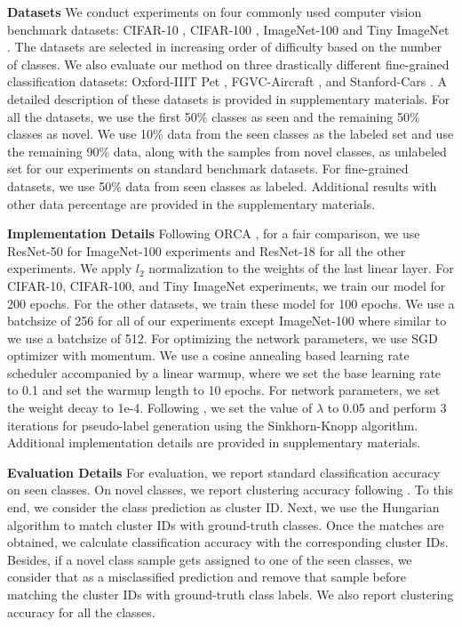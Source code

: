 \documentclass[runningheads]{eccv2022submission}
\begin{document}
\vspace{1mm}
\label{para:dataset}
\noindent \textbf{Datasets} We conduct experiments on four commonly used computer vision benchmark datasets: CIFAR-10 \cite{cifar10}, CIFAR-100 \cite{cifar100}, ImageNet-100 \cite{russakovsky2015imagenet} and Tiny ImageNet \cite{le2015tiny}. The datasets are selected in increasing order of difficulty based on the number of classes. We also evaluate our method on three drastically different fine-grained classification datasets: Oxford-IIIT Pet \cite{parkhi12a}, FGVC-Aircraft \cite{maji13fine-grained}, and Stanford-Cars \cite{KrauseStarkDengFei-Fei_3DRR2013}. A detailed description of these datasets is provided in supplementary materials. For all the datasets, we use the first 50\% classes as seen and the remaining 50\% classes as novel. We use 10\% data from the seen classes as the labeled set and use the remaining 90\% data, along with the samples from novel classes, as unlabeled set for our experiments on standard benchmark datasets. For fine-grained datasets, we use 50\% data from seen classes as labeled. Additional results with other data percentage are provided in the supplementary materials.

\vspace{1mm}
\label{para:implimentation}
\noindent \textbf{Implementation Details} Following ORCA \cite{cao2022openworld}, for a fair comparison, we use ResNet-50 \cite{he2016deep} for ImageNet-100 experiments and ResNet-18 \cite{he2016deep} for all the other experiments. We apply $l_2$ normalization to the weights of the last linear layer. For CIFAR-10, CIFAR-100, and Tiny ImageNet experiments, we train our model for 200 epochs. For the other datasets, we train these model for 100 epochs. We use a batchsize of 256 for all of our experiments except ImageNet-100 where similar to \cite{cao2022openworld} we use a batchsize of 512. For optimizing the network parameters, we use SGD optimizer with momentum. We use a cosine annealing based learning rate scheduler accompanied by a linear warmup, where we set the base learning rate to 0.1 and set the warmup length to 10 epochs. For network parameters, we set the weight decay to 1e-4. Following \cite{caron2020unsupervised}, we set the value of $\lambda$ to 0.05 and perform 3 iterations for pseudo-label generation using the Sinkhorn-Knopp algorithm. Additional implementation details are provided in supplementary materials.

\vspace{1mm}
\noindent \textbf{Evaluation Details} For evaluation, we report standard classification accuracy on seen classes. On novel classes, we report clustering accuracy following \cite{cao2022openworld,Han2020Automatically,fini2021unified,han2019learning}. To this end, we consider the class prediction as cluster ID. Next, we use the Hungarian algorithm \cite{kuhn1955hungarian} to match cluster IDs with ground-truth classes. Once the matches are obtained, we calculate classification accuracy with the corresponding cluster IDs. Besides, if a novel class sample gets assigned to one of the seen classes, we consider that as a misclassified prediction and remove that sample before matching the cluster IDs with ground-truth class labels. We also report clustering accuracy for all the classes.
\end{document}
